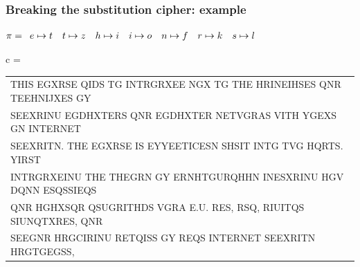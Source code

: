 \documentclass[aspectratio=169, lualatex, 10pt,dvipsnames,svgnames]{beamer} %
\def\enbleu#1{\textcolor{bleu}{#1}}
\def\enrouge#1{\textcolor{rouge}{#1}}
\begin{document}
\begin{frame}
  \frametitle{Breaking the substitution cipher: example}
  
    \enrouge{
    \tiny{$\pi=
      \begin{array}[t]{l}
      e\mapsto t\quad t\mapsto z \quad h\mapsto i\quad i\mapsto o\quad n\mapsto f\quad r\mapsto k\quad s\mapsto l 
      \end{array}
      $}}
  \vspace{0.25cm}

  \color{vert}
  \tiny{c =
    \begin{tabular}[t]{l}
      \enbleu{T}\enbleu{H}\enbleu{I}\enbleu{S} EGX\enbleu{R}\enbleu{S}\enbleu{E} Q\enbleu{I}D\enbleu{S} \enbleu{T}G \enbleu{I}\enbleu{N}\enbleu{T}\enbleu{R}GRXE\enbleu{E} NGX \enbleu{T}G \enbleu{T}\enbleu{H}\enbleu{E} H\enbleu{R}\enbleu{I}\enbleu{N}E\enbleu{I}HS\enbleu{E}\enbleu{S} Q\enbleu{N}R \enbleu{T}\enbleu{E}E\enbleu{H}\enbleu{N}\enbleu{I}JX\enbleu{E}\enbleu{S} GY \\
      \enbleu{S}\enbleu{E}EX\enbleu{R}\enbleu{I}\enbleu{N}U EGDHX\enbleu{T}\enbleu{E}\enbleu{R}\enbleu{S} Q\enbleu{N}R EGDHX\enbleu{T}\enbleu{E}\enbleu{R} \enbleu{N}\enbleu{E}\enbleu{T}VG\enbleu{R}A\enbleu{S} V\enbleu{I}\enbleu{T}\enbleu{H} YGEX\enbleu{S} G\enbleu{N} \enbleu{I}\enbleu{N}\enbleu{T}\enbleu{E}\enbleu{R}\enbleu{N}\enbleu{E}\enbleu{T} \\
      \enbleu{S}\enbleu{E}EX\enbleu{R}\enbleu{I}\enbleu{T}N. \enbleu{T}\enbleu{H}\enbleu{E} EGX\enbleu{R}\enbleu{S}\enbleu{E} \enbleu{I}\enbleu{S} \enbleu{E}YY\enbleu{E}E\enbleu{T}\enbleu{I}C\enbleu{E}SN \enbleu{S}HS\enbleu{I}\enbleu{T} \enbleu{I}\enbleu{N}\enbleu{T}G \enbleu{T}VG HQ\enbleu{R}\enbleu{T}\enbleu{S}. Y\enbleu{I}\enbleu{R}\enbleu{S}\enbleu{T} \\
      \enbleu{I}\enbleu{N}\enbleu{T}\enbleu{R}GRXE\enbleu{I}\enbleu{N}U \enbleu{T}\enbleu{H}\enbleu{E} \enbleu{T}\enbleu{H}\enbleu{E}G\enbleu{R}N GY E\enbleu{R}NH\enbleu{T}GU\enbleu{R}QH\enbleu{H}N \enbleu{I}\enbleu{N}ESXR\enbleu{I}\enbleu{N}U \enbleu{H}GV DQ\enbleu{N}N ESQ\enbleu{S}\enbleu{S}\enbleu{I}EQS \\
      Q\enbleu{N}R HGHXSQ\enbleu{R} QSUG\enbleu{R}\enbleu{I}\enbleu{T}\enbleu{H}D\enbleu{S} VG\enbleu{R}A \enbleu{E}.U. R\enbleu{E}\enbleu{S}, \enbleu{R}\enbleu{S}Q, R\enbleu{I}U\enbleu{I}\enbleu{T}QS \enbleu{S}\enbleu{I}U\enbleu{N}Q\enbleu{T}X\enbleu{R}\enbleu{E}\enbleu{S}, Q\enbleu{N}R \\
      \enbleu{S}\enbleu{E}EG\enbleu{N}R H\enbleu{R}GC\enbleu{I}R\enbleu{I}\enbleu{N}U R\enbleu{E}\enbleu{T}Q\enbleu{I}S\enbleu{S} GY \enbleu{R}\enbleu{E}QS \enbleu{I}\enbleu{N}\enbleu{T}\enbleu{E}\enbleu{R}\enbleu{N}\enbleu{E}\enbleu{T} \enbleu{S}\enbleu{E}EX\enbleu{R}\enbleu{I}\enbleu{T}N H\enbleu{R}G\enbleu{T}GEGS\enbleu{S}, \\

\end{tabular}}
\end{frame}
\end{document}
